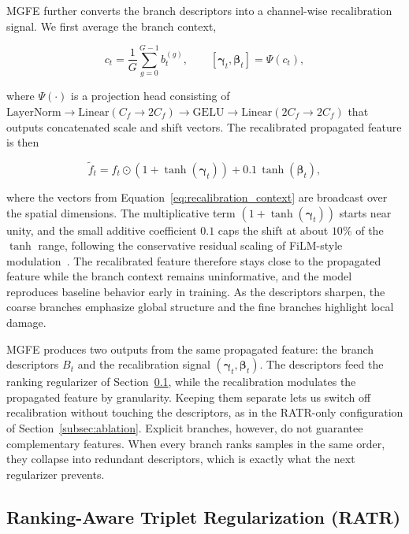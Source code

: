 MGFE further converts the branch descriptors into a channel-wise recalibration signal. We first average the branch context,

\begin{equation}
c_t = \frac{1}{G}\sum_{g=0}^{G-1}b_t^{(g)},
\qquad
[\boldsymbol{\gamma}_t,\boldsymbol{\beta}_t] = \Psi(c_t),
\label{eq:recalibration_context}
\end{equation}

where $\Psi(\cdot)$ is a projection head consisting of $\mathrm{LayerNorm}\!\rightarrow\!\mathrm{Linear}(C_f\!\rightarrow\!2C_f)\!\rightarrow\!\mathrm{GELU}\!\rightarrow\!\mathrm{Linear}(2C_f\!\rightarrow\!2C_f)$ that outputs concatenated scale and shift vectors. The recalibrated propagated feature is then

\begin{equation}
\widetilde{f}_t =
f_t \odot
\left(1+\tanh(\boldsymbol{\gamma}_t)\right)
+ 0.1\,\tanh(\boldsymbol{\beta}_t),
\label{eq:recalibration}
\end{equation}

where the vectors from Equation~\eqref{eq:recalibration_context} are broadcast over the spatial dimensions. The multiplicative term $(1+\tanh(\boldsymbol{\gamma}_t))$ starts near unity, and the small additive coefficient $0.1$ caps the shift at about $10\%$ of the $\tanh$ range, following the conservative residual scaling of FiLM-style modulation~\cite{perez2018film}. The recalibrated feature therefore stays close to the propagated feature while the branch context remains uninformative, and the model reproduces baseline behavior early in training. As the descriptors sharpen, the coarse branches emphasize global structure and the fine branches highlight local damage.

MGFE produces two outputs from the same propagated feature: the branch descriptors $B_t$ and the recalibration signal $(\boldsymbol{\gamma}_t, \boldsymbol{\beta}_t)$. The descriptors feed the ranking regularizer of Section~\ref{subsec:ratr}, while the recalibration modulates the propagated feature by granularity. Keeping them separate lets us switch off recalibration without touching the descriptors, as in the RATR-only configuration of Section~\ref{subsec:ablation}. Explicit branches, however, do not guarantee complementary features. When every branch ranks samples in the same order, they collapse into redundant descriptors, which is exactly what the next regularizer prevents.

\subsection{Ranking-Aware Triplet Regularization (RATR)}
\label{subsec:ratr}

